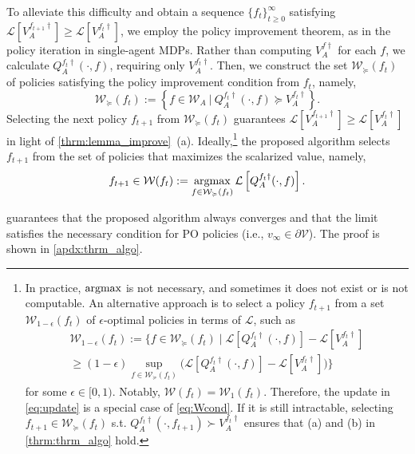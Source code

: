 \documentclass{acml}
\providecommand{\argmax}{\operatornamewithlimits{argmax}} %
\begin{document}
To alleviate this difficulty and obtain a sequence $\{f_t\}_{t\ge 0}^{\infty}$ satisfying $\mathcal{L}[V_A^{f_{t+1}\dag}] \ge \mathcal{L}[V_A^{f_{t}\dag}]$, we employ the policy improvement theorem, as in the policy iteration in single-agent MDPs. Rather than computing $V_A^{f\dag}$ for each $f$, we calculate $Q_A^{f_t\dag}(\cdot, f)$, requiring only $V_A^{f_t\dag}$. Then, we construct the set $\mathcal{W}_\succcurlyeq(f_t)$ of policies satisfying the policy improvement condition from $f_t$, namely,
\begin{equation}    \mathcal{W}_\succcurlyeq(f_t):=\left\{f\in\mathcal{W}_A~|~Q_A^{f_t\dag}(\cdot,f)\succcurlyeq V_A^{f_t\dag}\right\}.\label{eq:def_hat_W}
\end{equation}
Selecting the next policy $f_{t+1}$ from $\mathcal{W}_\succcurlyeq(f_t)$ guarantees $\mathcal{L}[V_A^{f_{t+1}\dag}] \ge \mathcal{L}[V_A^{f_{t}\dag}]$ in light of \cref{thrm:lemma_improve}~(a).
Ideally,\footnote{
	In practice, 
	$\argmax$ is not necessary, and sometimes it 
	does not exist or is not computable. 
	An alternative  approach is to select a policy $f_{t+1}$ from a set $\mathcal{W}_{1-\epsilon}(f_t)$ of $\epsilon$-optimal policies in terms of $\mathcal{L}$, such as
	\begin{multline}
		\mathcal{W}_{1-\epsilon}(f_t) := \bigg\{ f \in \mathcal{W}_\succcurlyeq(f_t) \mid
		\mathcal{L}\left[ Q_A^{f_t\dag}(\cdot,f) \right] - \mathcal{L}\left[ V_A^{f_t\dag}\right] \\
		\ge (1 - \epsilon) \sup_{f \in \mathcal{W}_\succcurlyeq(f_t)} \bigg( \mathcal{L}\left[ Q_A^{f_t\dag}(\cdot,f) \right] - \mathcal{L}\left[ V_A^{f_t\dag}\right] \bigg) \bigg\}\label{eq:Wcond}
	\end{multline}
	for some $\epsilon \in [0, 1)$. 
	Notably, $\mathcal{W}(f_t) = \mathcal{W}_{1}(f_t)$. Therefore, the update in \cref{eq:update} is a special case of \cref{eq:Wcond}.
	If it is still intractable, selecting $f_{t+1}\in\mathcal{W}_\succcurlyeq(f_t)$ s.t. $Q_A^{f_t\dag}(\cdot,f_{t+1})\succ V_A^{f_t\dag}$ ensures that (a) and (b) in \cref{thrm:thrm_algo} hold.} the proposed algorithm selects $f_{t+1}$ from the set of policies that maximizes the scalarized value, namely,
\begin{align}
	f_{t+1}\in\mathcal{W}(f_t):=\argmax_{f\in\mathcal{W}_\succcurlyeq(f_t)} \mathcal{L}\left[ Q_A^{f_t\dag}(\cdot,f) \right].\label{eq:update}
\end{align}

 guarantees that the proposed algorithm always converges and that the limit satisfies the necessary condition for PO policies (i.e., $v_\infty \in \partial \mathcal{V}$).
The proof is shown in \cref{apdx:thrm_algo}.
\end{document}
